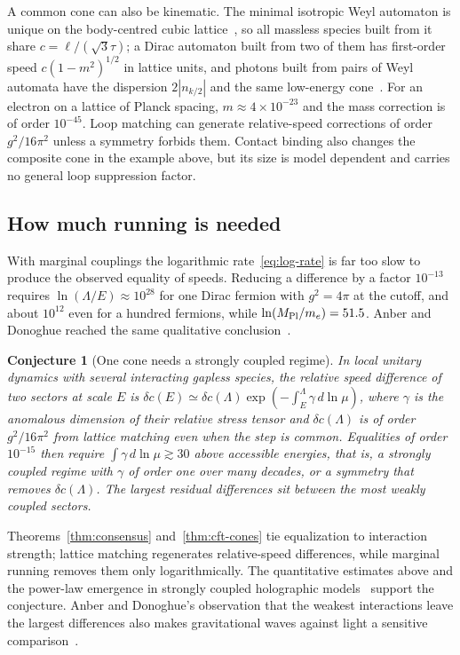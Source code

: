 \documentclass[12pt]{article}
\newtheorem{conjecture}[theorem]{Conjecture}
\theoremstyle{definition}
\theoremstyle{remark}
\begin{document}
A common cone can also be kinematic. The minimal isotropic Weyl automaton is unique on the body-centred cubic lattice~\cite{DArianoPerinotti2014}, so all massless species built from it share $c=\ell/(\sqrt3\tau)$; a Dirac automaton built from two of them has first-order speed $c(1-m^2)^{1/2}$ in lattice units, and photons built from pairs of Weyl automata have the dispersion $2|n_{k/2}|$ and the same low-energy cone~\cite{BisioDArianoPerinotti2016}. For an electron on a lattice of Planck spacing, $m\approx4\times10^{-23}$ and the mass correction is of order $10^{-45}$. Loop matching can generate relative-speed corrections of order $g^2/16\pi^2$ unless a symmetry forbids them. Contact binding also changes the composite cone in the example above, but its size is model dependent and carries no general loop suppression factor.

\subsection{How much running is needed}

With marginal couplings the logarithmic rate~\eqref{eq:log-rate} is far too slow to produce the observed equality of speeds. Reducing a difference by a factor $10^{-13}$ requires $\ln(\Lambda/E)\approx10^{28}$ for one Dirac fermion with $g^2=4\pi$ at the cutoff, and about $10^{12}$ even for a hundred fermions, while $\ln(M_{\rm Pl}/m_e)=51.5$. Anber and Donoghue reached the same qualitative conclusion~\cite{AnberDonoghue2011}.

\begin{conjecture}[One cone needs a strongly coupled regime]
\label{conj:power}
In local unitary dynamics with several interacting gapless species, the relative speed difference of two sectors at scale $E$ is $\delta c(E)\simeq\delta c(\Lambda)\exp(-\int_E^\Lambda\gamma\,d\ln\mu)$, where $\gamma$ is the anomalous dimension of their relative stress tensor and $\delta c(\Lambda)$ is of order $g^2/16\pi^2$ from lattice matching even when the step is common. Equalities of order $10^{-15}$ then require $\int\gamma\,d\ln\mu\gtrsim30$ above accessible energies, that is, a strongly coupled regime with $\gamma$ of order one over many decades, or a symmetry that removes $\delta c(\Lambda)$. The largest residual differences sit between the most weakly coupled sectors.
\end{conjecture}

Theorems~\ref{thm:consensus} and~\ref{thm:cft-cones} tie equalization to interaction strength; lattice matching regenerates relative-speed differences, while marginal running removes them only logarithmically. The quantitative estimates above and the power-law emergence in strongly coupled holographic models~\cite{BednikPujolasSibiryakov2013} support the conjecture. Anber and Donoghue's observation that the weakest interactions leave the largest differences also makes gravitational waves against light a sensitive comparison~\cite{AnberDonoghue2011}.
\end{document}
